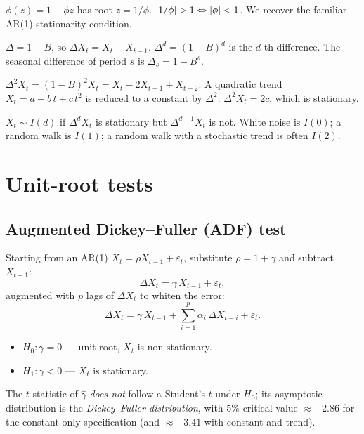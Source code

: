 \begin{exbox}[AR(1)]
$\phi(z) = 1 - \phi z$ has root $z = 1 / \phi$.
$\left\lvert 1 / \phi \right\rvert > 1 \Leftrightarrow \left\lvert \phi \right\rvert < 1$. We recover the
familiar AR(1) stationarity condition.
\end{exbox}

\begin{defbox}
\label{def:difference}
$\Delta = 1 - B$, so $\Delta X_t = X_t - X_{t-1}$.
$\Delta^d = (1 - B)^d$ is the $d$-th difference.
The seasonal difference of period $s$ is
$\Delta_s = 1 - B^s$.
\end{defbox}

\begin{exbox}
$\Delta^2 X_t = (1 - B)^2 X_t = X_t - 2 X_{t-1} + X_{t-2}$.
A quadratic trend $X_t = a + b\,t + c\,t^2$ is reduced to a constant
by $\Delta^2$:
$\Delta^2 X_t = 2c$, which is stationary.
\end{exbox}

\begin{defbox}
$X_t \sim I(d)$ if $\Delta^d X_t$ is stationary but
$\Delta^{d - 1} X_t$ is not. White noise is $I(0)$; a random walk is
$I(1)$; a random walk with a stochastic trend is often $I(2)$.
\end{defbox}

\section{Unit-root tests}
\label{sec:unit-roots}

\subsection{Augmented Dickey--Fuller (ADF) test}

\begin{defbox}
\label{def:adf}
Starting from an AR(1) $X_t = \rho X_{t-1} + \varepsilon_t$,
substitute $\rho = 1 + \gamma$ and subtract $X_{t-1}$:
\[
  \Delta X_t = \gamma\, X_{t-1} + \varepsilon_t,
\]
augmented with $p$ lags of $\Delta X_t$ to whiten the error:
\[
  \Delta X_t = \gamma\, X_{t-1}
             + \sum_{i = 1}^{p} \alpha_i\, \Delta X_{t-i}
             + \varepsilon_t.
\]
\end{defbox}

\begin{thbox}
\label{th:adf}
\begin{itemize}
  \item $H_0 : \gamma = 0$ — unit root, $X_t$ is non-stationary.
  \item $H_1 : \gamma < 0$ — $X_t$ is stationary.
\end{itemize}
The $t$-statistic of $\widehat\gamma$ \emph{does not} follow a
Student's $t$ under $H_0$; its asymptotic distribution is the
\emph{Dickey--Fuller distribution}, with 5\% critical value
$\approx -2.86$ for the constant-only specification (and
$\approx -3.41$ with constant and trend).
\end{thbox}

